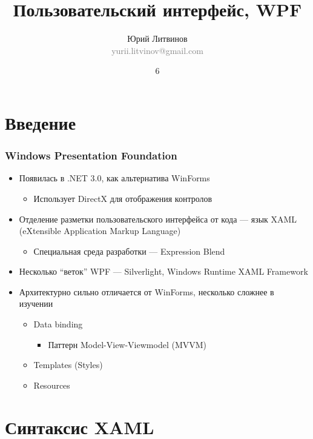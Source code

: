 \documentclass[xetex,mathserif,serif]{beamer}
\title{Пользовательский интерфейс, WPF}
\author[Юрий Литвинов]{Юрий Литвинов\\\small{\textcolor{gray}{yurii.litvinov@gmail.com}}}
\date{6}
\begin{document}
	\frame{\titlepage}

	\section{Введение}

	\begin{frame}
		\frametitle{Windows Presentation Foundation}
		\begin{itemize}
			\item Появилась в .NET 3.0, как альтернатива WinForms
			\begin{itemize}
				\item Использует DirectX для отображения контролов
			\end{itemize}
			\item Отделение разметки пользовательского интерфейса от кода --- язык XAML (eXtensible Application Markup Language)
			\begin{itemize}
				\item Специальная среда разработки --- Expression Blend
			\end{itemize}
			\item Несколько ``веток'' WPF --- Silverlight, Windows Runtime XAML Framework
			\item Архитектурно сильно отличается от WinForms, несколько сложнее в изучении
			\begin{itemize}
				\item Data binding
				\begin{itemize}
					\item Паттерн Model-View-Viewmodel (MVVM)
				\end{itemize}
				\item Templates (Styles)
				\item Resources
			\end{itemize}
		\end{itemize}
	\end{frame}

	\section{Синтаксис XAML}
\end{document}
